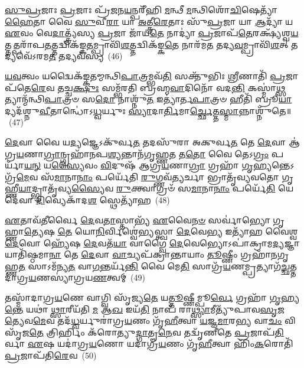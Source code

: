 \-\ul{𑌸𑍁}\-\-\ul{𑌪𑍍𑌰}\-𑌜𑌾𑌃 \ul{𑌪𑍍𑌰}\-𑌜𑌾𑌃 𑌪𑍍𑌰᳴\-\ul{𑌜}\-𑌨\-\ul{𑌯}\-𑌨𑍍𑌪𑌰𑍀᳴𑌹𑌿 \ul{𑌮}\-𑌨𑍍𑌥𑍀 \ul{𑌮}\-𑌨𑍍𑌥𑌿𑌶𑍋᳴\-\ul{𑌚𑌿}\-𑌷𑍇𑌤𑍍𑌯𑌾᳴\-\ul{𑌹𑍈}\-𑌤𑌾 𑌵𑍈 \ul{𑌸𑍁}\-𑌵𑍀\-\ul{𑌰𑌾} 𑌯𑌾 \ul{𑌅}\-𑌤𑍍𑌤𑍍𑌰𑍀\-\ul{𑌰𑍇}\-𑌤𑌾𑌃 𑌸𑍁᳴\-\ul{𑌪𑍍𑌰}\-𑌜𑌾 𑌯𑌾 \ul{𑌆}\-𑌦𑍍𑌯𑌾᳴ 𑌯 \ul{𑌏}\-𑌵𑌂 𑌵𑍇\-\ul{𑌦𑌾}\-𑌤𑍍𑌤𑍍𑌰𑍍𑌯᳴𑌸𑍍𑌯 \ul{𑌪𑍍𑌰}\-𑌜𑌾 𑌜𑌾᳴𑌯\-\ul{𑌤𑍇} 𑌨𑌾𑌦𑍍𑌯𑌾॑ \ul{𑌪𑍍𑌰}\-𑌜𑌾𑌪᳴\-\ul{𑌤𑍇}\-𑌰𑌕𑍍𑌷𑍍𑌯᳴𑌶𑍍𑌵\-\ul{𑌯}\-𑌤𑍍𑌤𑌤𑍍𑌪𑌰𑌾᳴𑌪\-\ul{𑌤}\-𑌤𑍍𑌤𑌦𑍍𑌵𑌿𑌕᳴𑌙𑍍𑌕\-\ul{𑌤}\-𑌮𑍍𑌪𑍍𑌰𑌾𑌵𑌿᳴\-\ul{𑌶}\-𑌤𑍍𑌤𑌦𑍍𑌵𑌿𑌕᳴𑌙𑍍𑌕\-\ul{𑌤𑍇} 𑌨𑌾𑌰᳴𑌮\-\ul{𑌤} 𑌤𑌦𑍍𑌯\-\ul{𑌵}\-𑌮𑍍𑌪𑍍𑌰𑌾𑌵𑌿᳴\-\ul{𑌶}\-𑌤𑍍 𑌤𑌦𑍍𑌯𑌵𑍇᳴\-𑌽𑌰𑌮\-\ul{𑌤} 𑌤𑌦𑍍𑌯𑌵᳴𑌸𑍍𑌯~(46)

\-\ul{𑌯}\-\-\ul{𑌵}\-𑌤𑍍𑌵𑌂 𑌯𑌦𑍍𑌵𑍈𑌕᳴𑌙𑍍𑌕𑌤𑌮𑍍𑌮𑌨𑍍𑌥𑌿\-\ul{𑌪𑌾}\-𑌤𑍍𑌰𑌮𑍍𑌭𑌵᳴\-\ul{𑌤𑌿} 𑌸𑌕𑍍𑌤𑍁᳴𑌭𑌿𑌃 \ul{𑌶𑍍𑌰𑍀}\-𑌣𑌾𑌤𑌿᳴ \ul{𑌪𑍍𑌰}\-𑌜𑌾𑌪᳴𑌤𑍇\-\ul{𑌰𑍇}\-𑌵 𑌤𑌚𑍍𑌚\-\ul{𑌕𑍍𑌷𑍁𑌃} 𑌸𑌮𑍍𑌭᳴𑌰𑌤𑌿 𑌬𑍍𑌰𑌹𑍍𑌮\-\ul{𑌵𑌾}\-𑌦𑌿𑌨𑍋᳴ 𑌵𑌦\-\ul{𑌨𑍍𑌤𑌿} 𑌕𑌸𑍍𑌮𑌾॑\-\ul{𑌥𑍍𑌸}\-𑌤𑍍𑌯𑌾𑌨𑍍𑌮᳴𑌨𑍍𑌥𑌿\-\ul{𑌪𑌾}\-𑌤𑍍𑌰𑍞 𑌸\-\ul{𑌦𑍋} 𑌨𑌾𑌶𑍍𑌨𑍁᳴\-\ul{𑌤} 𑌇𑌤𑍍𑌯𑌾॑𑌰𑍍𑌤\-\ul{𑌪𑌾}\-𑌤𑍍𑌰𑍞 𑌹𑍀𑌤𑌿᳴ 𑌬𑍍𑌰𑍂\-\ul{𑌯𑌾}\-𑌦𑍍𑌯𑌦᳴𑌶𑍍𑌨𑍁\-\ul{𑌵𑍀}\-𑌤𑌾𑌨𑍍𑌧𑍋॑\-𑌽\-\ul{𑌧𑍍𑌵}\-𑌰𑍍𑌯𑍁𑌃 \ul{𑌸𑍍𑌯𑌾}\-𑌦𑌾\-\ul{𑌰𑍍𑌤𑌿}\-𑌮𑌾\-\ul{𑌰𑍍𑌚𑍍𑌛𑍇}\-𑌤𑍍𑌤\-\ul{𑌸𑍍𑌮𑌾}\-𑌨𑍍𑌨𑌾𑌶𑍍𑌨𑍁᳴𑌤𑍇॥~(47)

{\anuvakamend[{\-\ul{𑌆}\-𑌤𑍍𑌮\-\ul{𑌨𑌾} 𑌪\-\ul{𑌰𑌾} 𑌨𑌿𑌷𑍍𑌪𑍍𑌰 \ul{𑌶𑍁}\-𑌕𑍍𑌰𑌶𑍋᳴𑌚𑌿\-\ul{𑌷𑌾} 𑌯𑌵᳴𑌸𑍍𑌯 \ul{𑌸}\-𑌪𑍍𑌤𑌤𑍍𑌰𑌿𑍞᳴𑌶𑌚𑍍𑌚}]}%

\-\ul{𑌦𑍇}\-𑌵𑌾 𑌵𑍈 𑌯\-\ul{𑌦𑍍𑌯}\-𑌜𑍍𑌞𑍇\-𑌽𑌕𑍁᳴𑌰𑍍𑌵\-\ul{𑌤} 𑌤𑌦𑌸𑍁᳴𑌰𑌾 𑌅𑌕𑍁𑌰𑍍𑌵\-\ul{𑌤} 𑌤𑍇 \ul{𑌦𑍇}\-𑌵𑌾 𑌆॑𑌗𑍍𑌰\-\ul{𑌯}\-𑌣𑌾\-\ul{𑌗𑍍𑌰𑌾}\-𑌨𑍍𑌗𑍍𑌰𑌹𑌾᳴𑌨𑌪\-\ul{𑌶𑍍𑌯}\-𑌨𑍍𑌤𑌾𑌨᳴𑌗𑍃𑌹𑍍𑌣\-\ul{𑌤} 𑌤\-\ul{𑌤𑍋} 𑌵𑍈 𑌤𑍇\-𑌽\-\ul{𑌗𑍍𑌰𑌂} 𑌪𑌰𑍍𑌯𑌾᳴\-\ul{𑌯}\-\-\ul{𑌨𑍍} 𑌯\-\ul{𑌸𑍍𑌯𑍈}\-𑌵𑌂 \ul{𑌵𑌿}\-𑌦𑍁𑌷᳴ 𑌆𑌗𑍍𑌰\-\ul{𑌯}\-𑌣𑌾\-\ul{𑌗𑍍𑌰𑌾} 𑌗𑍍𑌰𑌹𑌾᳴ \ul{𑌗𑍃}\-𑌹𑍍𑌯𑌨𑍍𑌤𑍇\-𑌽𑌗𑍍𑌰᳴\-\ul{𑌮𑍇}\-𑌵 𑌸᳴\-\ul{𑌮𑌾}\-𑌨𑌾\-\ul{𑌨𑌾𑌂} 𑌪𑌰𑍍𑌯𑍇᳴𑌤𑌿 \ul{𑌰𑍁}\-𑌗𑍍𑌣𑌵᳴\-\ul{𑌤𑍍𑌯}\-𑌰𑍍𑌚𑌾 𑌭𑍍𑌰𑌾𑌤𑍃᳴𑌵𑍍𑌯𑌵𑌤𑍋 𑌗𑍃𑌹𑍍𑌣𑍀\-\ul{𑌯𑌾}\-𑌦𑍍𑌭𑍍𑌰𑌾𑌤𑍃᳴𑌵𑍍𑌯\-\ul{𑌸𑍍𑌯𑍈}\-𑌵 \ul{𑌰𑍁}\-𑌕𑍍𑌤𑍍𑌵𑌾𑌗𑍍𑌰𑍞᳴ 𑌸\-\ul{𑌮𑌾}\-𑌨𑌾\-\ul{𑌨𑌾𑌂} 𑌪𑌰𑍍𑌯𑍇᳴\-\ul{𑌤𑌿} 𑌯𑍇 𑌦𑍇᳴𑌵𑌾 \ul{𑌦𑌿}\-𑌵𑍍𑌯𑍇𑌕𑌾᳴\-𑌦\-\ul{𑌶} 𑌸𑍍𑌥𑍇𑌤𑍍𑌯𑌾᳴𑌹~(48)

\-\ul{𑌏}\-𑌤𑌾𑌵᳴\-\ul{𑌤𑍀}\-𑌰𑍍𑌵𑍈 \ul{𑌦𑍇}\-𑌵\-\ul{𑌤𑌾}\-𑌸𑍍𑌤𑌾𑌭𑍍𑌯᳴ \ul{𑌏}\-𑌵𑍈\-\ul{𑌨}\-\-\ul{𑍞} 𑌸𑌰𑍍𑌵𑌾॑𑌭𑍍𑌯𑍋 𑌗𑍃𑌹𑍍𑌣𑌾\-\ul{𑌤𑍍𑌯𑍇}\-𑌷 \ul{𑌤𑍇} 𑌯𑍋\-\ul{𑌨𑌿}\-𑌰𑍍𑌵𑌿𑌶𑍍𑌵𑍇॑𑌭𑍍𑌯𑌸𑍍𑌤𑍍𑌵𑌾 \ul{𑌦𑍇}\-𑌵𑍇\-\ul{𑌭𑍍𑌯} 𑌇𑌤𑍍𑌯𑌾᳴𑌹 𑌵𑍈𑌶𑍍𑌵\-\ul{𑌦𑍇}\-𑌵𑍋 𑌹𑍍𑌯𑍇᳴𑌷 \ul{𑌦𑍇}\-𑌵𑌤᳴\-\ul{𑌯𑌾} 𑌵𑌾𑌗𑍍𑌵𑍈 \ul{𑌦𑍇}\-𑌵𑍇𑌭𑍍𑌯𑍋\-𑌽𑌪𑌾॑𑌕𑍍𑌰𑌾𑌮\-\ul{𑌦𑍍𑌯}\-𑌜𑍍𑌞𑌾𑌯𑌾𑌤𑌿᳴𑌷𑍍𑌠𑌮𑌾\-\ul{𑌨𑌾} 𑌤𑍇 \ul{𑌦𑍇}\-𑌵𑌾 \ul{𑌵𑌾}\-𑌚𑍍𑌯𑌪᳴𑌕𑍍𑌰𑌾𑌨𑍍𑌤𑌾𑌯𑌾𑌂 \ul{𑌤𑍂}\-𑌷𑍍𑌣𑍀𑌂 𑌗𑍍𑌰𑌹𑌾᳴𑌨𑌗𑍃𑌹𑍍𑌣\-\ul{𑌤} 𑌸𑌾\-𑌽𑌮᳴𑌨𑍍𑌯\-\ul{𑌤} 𑌵𑌾\-\ul{𑌗}\-𑌨𑍍𑌤𑌰𑍍𑌯᳴\-\ul{𑌨𑍍𑌤𑌿} 𑌵𑍈 𑌮𑍇\-\ul{𑌤𑌿} 𑌸𑌾𑌗𑍍𑌰᳴\-\ul{𑌯}\-𑌣𑌮𑍍𑌪𑍍𑌰𑌤𑍍𑌯𑌾𑌗᳴\-\ul{𑌚𑍍𑌛}\-𑌤𑍍𑌤𑌦𑌾॑𑌗𑍍𑌰\-\ul{𑌯}\-𑌣𑌸𑍍𑌯𑌾॑𑌗𑍍𑌰𑌯\-\ul{𑌣}\-𑌤𑍍𑌵𑌮𑍍~(49)

𑌤𑌸𑍍𑌮𑌾᳴𑌦𑌾𑌗𑍍𑌰\-\ul{𑌯}\-𑌣𑍇 𑌵𑌾𑌗𑍍𑌵𑌿 𑌸𑍃᳴𑌜𑍍𑌯\-\ul{𑌤𑍇} 𑌯\-\ul{𑌤𑍍𑌤𑍂}\-𑌷𑍍𑌣𑍀𑌮𑍍𑌪𑍂\-\ul{𑌰𑍍𑌵𑍇} 𑌗𑍍𑌰𑌹𑌾᳴ \ul{𑌗𑍃}\-𑌹𑍍𑌯\-\ul{𑌨𑍍𑌤𑍇} 𑌯𑌥𑌾॑ \ul{𑌥𑍍𑌸𑌾}\-𑌰𑍀𑌯᳴𑌤𑌿 \ul{𑌮} 𑌆\-\ul{𑌖} 𑌇𑌯᳴\-\ul{𑌤𑌿} 𑌨𑌾𑌪᳴ 𑌰𑌾\-\ul{𑌥𑍍𑌸𑍍𑌯𑌾}\-𑌮𑍀𑌤𑍍𑌯𑍁᳴𑌪𑌾𑌵\-\ul{𑌸𑍃}\-𑌜\-\ul{𑌤𑍍𑌯𑍇}\-𑌵\-\ul{𑌮𑍇}\-𑌵 𑌤𑌦᳴\-\ul{𑌧𑍍𑌵}\-𑌰𑍍𑌯𑍁𑌰𑌾॑𑌗𑍍𑌰\-\ul{𑌯}\-𑌣𑌂 𑌗𑍃᳴\-\ul{𑌹𑍀}\-𑌤𑍍𑌵𑌾 \ul{𑌯}\-𑌜𑍍𑌞\-\ul{𑌮𑌾}\-𑌰\-\ul{𑌭𑍍𑌯} 𑌵𑌾\-\ul{𑌚𑌂} 𑌵𑌿 𑌸𑍃᳴𑌜\-\ul{𑌤𑍇} 𑌤𑍍𑌰𑌿𑌰𑍍\mbox{}𑌹𑌿𑌂 𑌕᳴𑌰𑍋𑌤𑍍𑌯𑍁\-\ul{𑌦𑍍𑌗𑌾}\-𑌤𑍄\-\ul{𑌨𑍇}\-𑌵 𑌤𑌦𑍍𑌵𑍃᳴𑌣𑍀𑌤𑍇 \ul{𑌪𑍍𑌰}\-𑌜𑌾𑌪᳴\-\ul{𑌤𑌿}\-𑌰𑍍𑌵𑌾 \ul{𑌏}\-𑌷 𑌯𑌦𑌾॑𑌗𑍍𑌰\-\ul{𑌯}\-𑌣𑍋 𑌯𑌦𑌾॑𑌗𑍍𑌰\-\ul{𑌯}\-𑌣𑌂 𑌗𑍃᳴\-\ul{𑌹𑍀}\-𑌤𑍍𑌵𑌾 𑌹𑌿𑌂᳴\-\ul{𑌕}\-𑌰𑍋𑌤𑌿᳴ \ul{𑌪𑍍𑌰}\-𑌜𑌾𑌪᳴𑌤𑌿\-\ul{𑌰𑍇}\-𑌵~(50)

